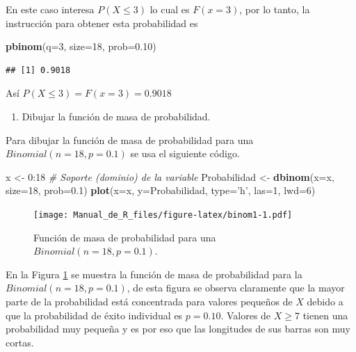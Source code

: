 \documentclass[10pt,]{krantz}
\makeatletter
\newenvironment{Shaded}{\begin{snugshade}}{\end{snugshade}}
\newcommand{\KeywordTok}[1]{\textcolor[rgb]{0.13,0.29,0.53}{\textbf{{#1}}}}
\newcommand{\DataTypeTok}[1]{\textcolor[rgb]{0.13,0.29,0.53}{{#1}}}
\newcommand{\DecValTok}[1]{\textcolor[rgb]{0.00,0.00,0.81}{{#1}}}
\newcommand{\FloatTok}[1]{\textcolor[rgb]{0.00,0.00,0.81}{{#1}}}
\newcommand{\StringTok}[1]{\textcolor[rgb]{0.31,0.60,0.02}{{#1}}}
\newcommand{\CommentTok}[1]{\textcolor[rgb]{0.56,0.35,0.01}{\textit{{#1}}}}
\newcommand{\NormalTok}[1]{{#1}}
\providecommand{\tightlist}{%
  \setlength{\itemsep}{0pt}\setlength{\parskip}{0pt}}
\newenvironment{kframe}{%
\medskip{}
\setlength{\fboxsep}{.8em}
 \def\at@end@of@kframe{}%
 \ifinner\ifhmode%
  \def\at@end@of@kframe{\end{minipage}}%
  \begin{minipage}{\columnwidth}%
 \fi\fi%
 \def\FrameCommand##1{\hskip\@totalleftmargin \hskip-\fboxsep
 \colorbox{shadecolor}{##1}\hskip-\fboxsep
     \hskip-\linewidth \hskip-\@totalleftmargin \hskip\columnwidth}%
 \MakeFramed {\advance\hsize-\width
   \@totalleftmargin\z@ \linewidth\hsize
   \@setminipage}}%
 {\par\unskip\endMakeFramed%
 \at@end@of@kframe}
\renewenvironment{Shaded}{\begin{kframe}}{\end{kframe}}
\makeatother
\begin{document}
En este caso interesa \(P(X\leq3)\) lo cual es \(F(x=3)\), por lo tanto,
la instrucción para obtener esta probabilidad es

\begin{Shaded}
\begin{Highlighting}[]
\KeywordTok{pbinom}\NormalTok{(}\DataTypeTok{q=}\DecValTok{3}\NormalTok{, }\DataTypeTok{size=}\DecValTok{18}\NormalTok{, }\DataTypeTok{prob=}\FloatTok{0.10}\NormalTok{)}
\end{Highlighting}
\end{Shaded}

\begin{verbatim}
## [1] 0.9018
\end{verbatim}

Así \(P(X\leq3)=F(x=3)=0.9018\)

\begin{enumerate}
\def\labelenumi{\arabic{enumi})}
\setcounter{enumi}{3}
\tightlist
\item
  Dibujar la función de masa de probabilidad.
\end{enumerate}

Para dibujar la función de masa de probabilidad para una
\(Binomial(n=18, p=0.1)\) se usa el siguiente código.

\begin{Shaded}
\begin{Highlighting}[]
\NormalTok{x <-}\StringTok{ }\DecValTok{0}\NormalTok{:}\DecValTok{18}  \CommentTok{# Soporte (dominio) de la variable}
\NormalTok{Probabilidad <-}\StringTok{ }\KeywordTok{dbinom}\NormalTok{(}\DataTypeTok{x=}\NormalTok{x, }\DataTypeTok{size=}\DecValTok{18}\NormalTok{, }\DataTypeTok{prob=}\FloatTok{0.1}\NormalTok{)}
\KeywordTok{plot}\NormalTok{(}\DataTypeTok{x=}\NormalTok{x, }\DataTypeTok{y=}\NormalTok{Probabilidad, }
     \DataTypeTok{type=}\StringTok{'h'}\NormalTok{, }\DataTypeTok{las=}\DecValTok{1}\NormalTok{, }\DataTypeTok{lwd=}\DecValTok{6}\NormalTok{)}
\end{Highlighting}
\end{Shaded}

\begin{figure}[htbp]
\centering
\texttt{[image: Manual\_de\_R\_files/figure-latex/binom1-1.pdf]}
\caption{\label{fig:binom1}Función de masa de probabilidad para una
\(Binomial(n=18, p=0.1)\).}
\end{figure}

En la Figura \ref{fig:binom1} se muestra la función de masa de
probabilidad para la \(Binomial(n=18, p=0.1)\), de esta figura se
observa claramente que la mayor parte de la probabilidad está
concentrada para valores pequeños de \(X\) debido a que la probabilidad
de éxito individual es \(p=0.10\). Valores de \(X \geq 7\) tienen una
probabilidad muy pequeña y es por eso que las longitudes de sus barras
son muy cortas.
\end{document}
